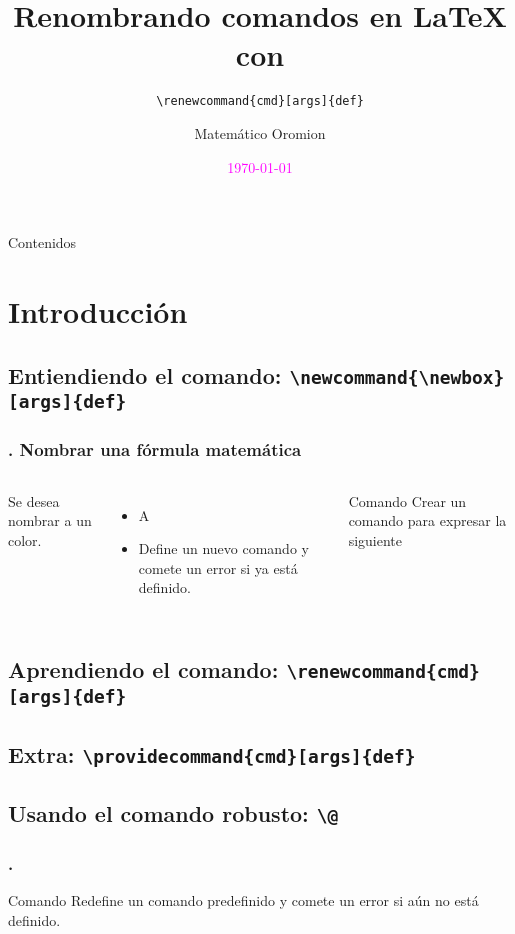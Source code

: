 \documentclass[12pt]{beamer}
\begin{document}
	\author{Matemático Oromion}
	\title{\Large Renombrando comandos en \LaTeX{} con}
	\cprotect\subtitle{\verb|\renewcommand{cmd}[args]{def}|}
	\date{\textcolor{magenta}{\today}}
	\subject{Fin del curso}
	\begin{frame}[plain]
	\maketitle
\end{frame}


\begin{frame}{Contenidos}{}
\tableofcontents
\end{frame}
\section{Introducción}
\cprotect\subsection{Entiendiendo el comando: \verb!\newcommand{\newbox}[args]{def}!}

\begin{frame}
\frametitle{\thesection. Nombrar una fórmula matemática}
\begin{columns}
	Se desea nombrar a un color.
	\begin{itemize}
		\item A
		\item Define un nuevo comando y comete un error si ya está definido.
	\end{itemize}
	\begin{examples}{Comando }
	Crear un comando para expresar la siguiente
	\end{examples}
\end{columns}
\end{frame}

\cprotect\subsection{Aprendiendo el comando: \verb!\renewcommand{cmd}[args]{def}!}
\cprotect\subsection{Extra: \verb!\providecommand{cmd}[args]{def}!}
\cprotect\subsection{Usando el comando robusto: \verb!\@!}
\begin{frame}
\frametitle{\thesection.}
\begin{block}{Comando }
Redefine un comando predefinido y comete un error si aún no está definido.
\end{block}
\end{frame}
\end{document}
